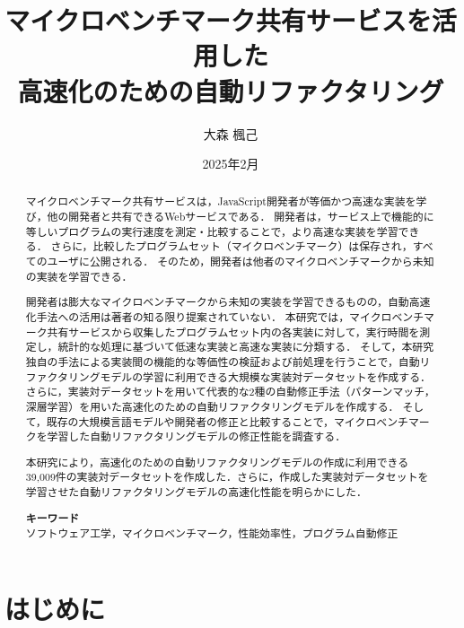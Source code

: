 \documentclass[11pt]{jreport}
\title{マイクロベンチマーク共有サービスを活用した\\高速化のための自動リファクタリング}
\author{大森 楓己}
\date{2025年2月}
\newcommand{\fix}[1]{#1}
\begin{document}
\maketitle

\begin{abstract}
マイクロベンチマーク共有サービスは，JavaScript開発者が\fix{等価かつ}高速な実装を学び，他の開発者と共有できるWebサービスである．
開発者は，サービス上で機能的に等しいプログラムの実行速度を測定・比較することで，より高速な実装を学習できる．
さらに，比較したプログラムセット（マイクロベンチマーク）は保存され，すべてのユーザに公開される．
そのため，開発者は他者のマイクロベンチマークから未知の実装を学習できる．

開発者は膨大なマイクロベンチマークから未知の実装を学習できるものの，自動高速化手法への活用は著者の知る限り提案されていない．
本研究では，マイクロベンチマーク共有サービスから収集したプログラムセット内の各実装に対して，実行時間を測定し，統計的な処理に基づいて低速な実装と高速な実装に分類する．
そして，本研究独自の手法による実装間の機能的な等価性の検証および前処理を行うことで，自動リファクタリングモデルの学習に利用できる大規模な実装対データセットを作成する．
さらに，実装対データセットを用いて代表的な2種の自動修正手法（パターンマッチ，深層学習）を用いた高速化のための自動リファクタリングモデルを作成する．
そして，既存の大規模言語モデルや開発者の修正と比較することで，マイクロベンチマークを学習した自動リファクタリングモデルの修正性能を調査する．

本研究により，高速化のための自動リファクタリングモデルの作成に利用できる39,009件の実装対データセットを作成した\fix{．さらに}，作成した実装対データセットを学習させた自動リファクタリングモデルの高速化性能を明らかにした．

\textbf{キーワード}\\ソフトウェア工学，マイクロベンチマーク，性能効率性，プログラム自動修正
\end{abstract}

\tableofcontents



\newpage
{}




\chapter{はじめに}\label{chapter:intro}
\end{document}
